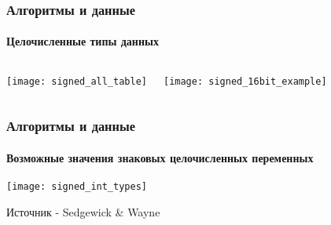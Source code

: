 \documentclass[aspectratio=169]{beamer}
\begin{document}
\begin{frame}
\frametitle{Алгоритмы и данные}
\framesubtitle{Целочисленные типы данных}
\justifying
\begin{block}{}
\begin{columns}[]
\column{\dimexpr\linewidth-60mm}
\justifying
\small

\centering
\texttt{[image: signed\_all\_table]}
\centering

\column{60mm}

\texttt{[image: signed\_16bit\_example]}
\centering

\end{columns}
\end{block}
\end{frame}

\begin{frame}
\frametitle{Алгоритмы и данные}
\framesubtitle{Возможные значения знаковых целочисленных переменных}
\justifying
\small
\centering
\texttt{[image: signed\_int\_types]}

\tiny Источник - Sedgewick \& Wayne 
\end{frame}
\end{document}
